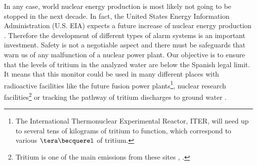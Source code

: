 In any case, world nuclear energy production is most likely not going to be stopped in the next decade. In fact, the United States Energy Information Administration (U.S. EIA) expects a future increase of nuclear energy production \cite{EIAOutlook}. Therefore the development of  different types of alarm systems is an important investment. Safety is not a negotiable aspect and there must be safeguards that warn us of any malfunction of a nuclear power plant. Our objective is to ensure that the levels of tritium in the analyzed water are below the Spanish legal limit. It means that this monitor could be used in many different places with radioactive facilities like the future fusion power plants\footnote{The International Thermonuclear Experimental Reactor, ITER, will need up to several tens of kilograms of tritium to function, which correspond to various $\tera\becquerel$ of tritium.}, nuclear research facilities\footnote{Tritium is one of the main emissions from these sites \cite{FERMILAB}, \cite{BrookHavenNationalLaboratory}.} or tracking the pathway of tritium discharges to ground water \cite{TrackingTritium}. 

